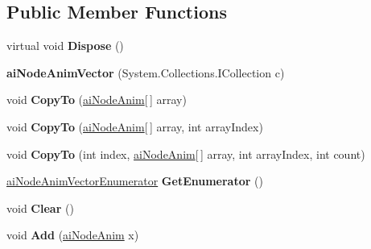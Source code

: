 \subsection*{Public Member Functions}
\begin{DoxyCompactItemize}
\item 
\hypertarget{classai_node_anim_vector_a0c1ae54cf45be939ee4b1819e7e35dc5}{virtual void {\bfseries Dispose} ()}\label{classai_node_anim_vector_a0c1ae54cf45be939ee4b1819e7e35dc5}

\item 
\hypertarget{classai_node_anim_vector_a969996555cdb12b066be0a4321b0240f}{{\bfseries ai\+Node\+Anim\+Vector} (System.\+Collections.\+I\+Collection c)}\label{classai_node_anim_vector_a969996555cdb12b066be0a4321b0240f}

\item 
\hypertarget{classai_node_anim_vector_ab5d4a82a20c4901092ae7f6113f8adfb}{void {\bfseries Copy\+To} (\hyperlink{structai_node_anim}{ai\+Node\+Anim}\mbox{[}$\,$\mbox{]} array)}\label{classai_node_anim_vector_ab5d4a82a20c4901092ae7f6113f8adfb}

\item 
\hypertarget{classai_node_anim_vector_acd6216071f14e788ac671e9216dff8d9}{void {\bfseries Copy\+To} (\hyperlink{structai_node_anim}{ai\+Node\+Anim}\mbox{[}$\,$\mbox{]} array, int array\+Index)}\label{classai_node_anim_vector_acd6216071f14e788ac671e9216dff8d9}

\item 
\hypertarget{classai_node_anim_vector_a6e931dad2b3eed352ff5c5f61a110f9e}{void {\bfseries Copy\+To} (int index, \hyperlink{structai_node_anim}{ai\+Node\+Anim}\mbox{[}$\,$\mbox{]} array, int array\+Index, int count)}\label{classai_node_anim_vector_a6e931dad2b3eed352ff5c5f61a110f9e}

\item 
\hypertarget{classai_node_anim_vector_ab8cc1903755eb3cf75da3accdde4f7cf}{\hyperlink{classai_node_anim_vector_1_1ai_node_anim_vector_enumerator}{ai\+Node\+Anim\+Vector\+Enumerator} {\bfseries Get\+Enumerator} ()}\label{classai_node_anim_vector_ab8cc1903755eb3cf75da3accdde4f7cf}

\item 
\hypertarget{classai_node_anim_vector_ae63ef603f84a6859f074d1cb55027593}{void {\bfseries Clear} ()}\label{classai_node_anim_vector_ae63ef603f84a6859f074d1cb55027593}

\item 
\hypertarget{classai_node_anim_vector_a7c3cee304511274299fc4435e7c855c5}{void {\bfseries Add} (\hyperlink{structai_node_anim}{ai\+Node\+Anim} x)}\label{classai_node_anim_vector_a7c3cee304511274299fc4435e7c855c5}


\end{DoxyCompactItemize}
